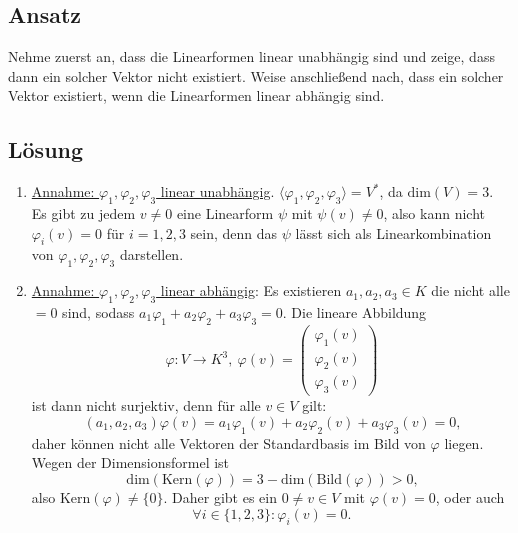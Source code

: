 \subsection{Ansatz}
Nehme zuerst an, dass die Linearformen linear unabhängig sind und zeige, dass dann ein solcher Vektor nicht existiert. Weise anschließend nach, dass ein solcher Vektor existiert, wenn die Linearformen linear abhängig sind.

\subsection{Lösung}
\begin{enumerate}
	\item \underline{Annahme: \( \varphi_1, \varphi_2, \varphi_3 \) linear unabhängig}. \( \langle \varphi_1, \varphi_2, \varphi_3 \rangle = V^\ast \), da \( \text{dim}(V) = 3 \). Es gibt zu jedem \( v \neq 0  \) eine Linearform \( \psi \) mit \( \psi(v) \neq 0 \), also kann nicht \( \varphi_i(v) = 0 \) für \( i= 1,2,3 \) sein, denn das \( \psi \) lässt sich als Linearkombination von \( \varphi_1, \varphi_2, \varphi_3 \) darstellen.

	\item \underline{Annahme: \( \varphi_1, \varphi_2, \varphi_3 \) linear abhängig}: Es existieren \( a_1, a_2, a_3 \in K \) die nicht alle \( =0 \) sind, sodass \( a_1\varphi_1+a_2\varphi_2+a_3\varphi_3 = 0 \). Die lineare Abbildung
	\begin{equation*}
		\varphi: V \to K^3, \ \varphi(v) = \begin{pmatrix}
			\varphi_1(v) \\
			\varphi_2(v) \\
			\varphi_3(v)
		\end{pmatrix}
	\end{equation*}
	ist dann nicht surjektiv, denn für alle \( v \in V \) gilt:
	\begin{equation*}
		(a_1, a_2, a_3)\varphi(v) = a_1\varphi_1(v) + a_2\varphi_2(v) + a_3\varphi_3(v) = 0\text{,}
	\end{equation*}
	daher können nicht alle Vektoren der Standardbasis im Bild von \( \varphi \) liegen. \\
	Wegen der Dimensionsformel ist
	\begin{equation*}
		\text{dim}(\text{Kern}(\varphi)) = 3 - \text{dim}(\text{Bild}(\varphi)) > 0\text{,}
	\end{equation*}
	also \( \text{Kern}(\varphi) \neq \{0\} \). Daher gibt es ein \( 0 \neq v \in V \) mit \( \varphi(v) = 0 \), oder auch
	\begin{equation*}
		\forall i \in \{1,2,3\}: \varphi_i(v) = 0\text{.}
	\end{equation*}
\end{enumerate}

